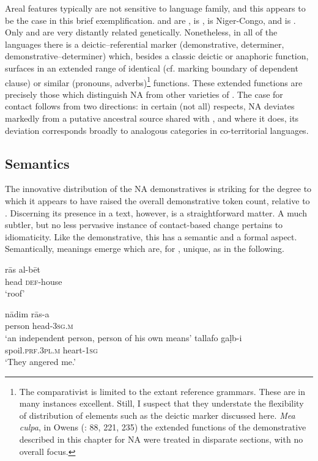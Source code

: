 \documentclass[output=paper]{langsci/langscibook}
\begin{document}
Areal features typically are not sensitive to language family, and this appears to be the case in this brief exemplification.  and  are ,  is ,  is Niger-Congo, and  is . Only  and  are very distantly related genetically. Nonetheless, in all of the languages there is a deictic–referential marker (demonstrative, determiner, demonstrative–determiner) which, besides a classic deictic or anaphoric function, surfaces in an extended range of identical (cf. marking boundary of dependent clause) or similar (pronouns, adverbs)\footnote{The comparativist is limited to the extant reference grammars. These are in many instances excellent. Still, I suspect that they understate the flexibility of distribution of elements such as the deictic marker discussed here. \textit{Mea culpa}, in Owens (\citeyear{Owens1993}: 88, 221, 235) the extended functions of the demonstrative described in this chapter for NA were treated in disparate sections, with no overall focus.} functions. These extended functions are precisely those which distinguish NA from other varieties of . The case for contact follows from two directions: in certain (not all) respects, NA deviates markedly from a putative ancestral source shared with , and where it does, its deviation corresponds broadly to analogous categories in co-territorial languages.

\subsection{Semantics}

The innovative distribution of the NA {demonstratives} is striking for the degree to which it appears to have raised the overall demonstrative token count, {relative} to . Discerning its presence in a text, however, is a straightforward matter. A much subtler, but no less pervasive instance of contact-based change pertains to {idiomaticity}. Like the demonstrative, this has a semantic and a formal aspect. Semantically, meanings emerge which are, for , unique, as in the following.

\ea\label{bet}
\ea
\gll rās al-bēt\\
     head \textsc{def-}house\\
\glt ‘roof’\label{roof}

\ex
\gll nādim rās-a\\
     person head-\textsc{3sg.m}\\
\glt ‘an independent person, person of his own means’\label{nadim}
\z
\ex\label{galb}
\ea
\gll tallafo gaḷb-i\\
     spoil.\textsc{prf.3pl.m} heart-1\textsc{sg}\\
\glt ‘They angered me.’
\end{document}
